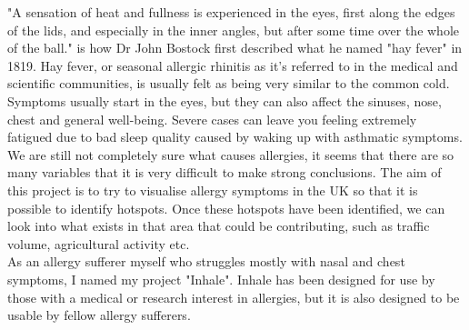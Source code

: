 "A sensation of heat and fullness is experienced in the eyes, first along the edges of the lids, and especially in the inner angles, but after some time over the whole of the ball." is how Dr John Bostock first described what he named "hay fever" in 1819. Hay fever, or seasonal allergic rhinitis as it's referred to in the medical and scientific communities, is usually felt as being very similar to the common cold. Symptoms usually start in the eyes, but they can also affect the sinuses, nose, chest and general well-being. Severe cases can leave you feeling extremely fatigued due to bad sleep quality caused by waking up with asthmatic symptoms.\\

We are still not completely sure what causes allergies, it seems that there are so many variables that it is very difficult to make strong conclusions. The aim of this project is to try to visualise allergy symptoms in the UK so that it is possible to identify hotspots. Once these hotspots have been identified, we can look into what exists in that area that could be contributing, such as traffic volume, agricultural activity etc.\\

As an allergy sufferer myself who struggles mostly with nasal and chest symptoms, I named my project "Inhale". Inhale has been designed for use by those with a medical or research interest in allergies, but it is also designed to be usable by fellow allergy sufferers.
